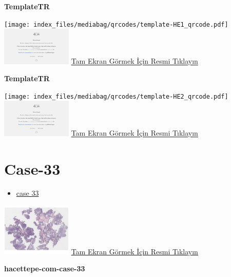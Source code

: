 \documentclass[
  letterpaper,
  DIV=11,
  numbers=noendperiod]{scrreprt}
\providecommand{\tightlist}{%
  \setlength{\itemsep}{0pt}\setlength{\parskip}{0pt}}\usepackage{longtable,booktabs,array}
\begin{document}
\textbf{TemplateTR}

\texttt{[image: index\_files/mediabag/qrcodes/template-HE1\_qrcode.pdf]}
\href{https://images.patolojiatlasi.com/template/HE1.html}{\includegraphics[width=0.25\textwidth,height=\textheight]{./screenshots/thumbnail_template-HE1.png}}
\href{https://images.patolojiatlasi.com/template/HE1.html}{Tam Ekran
Görmek İçin Resmi Tıklayın}

\textbf{TemplateTR}

\texttt{[image: index\_files/mediabag/qrcodes/template-HE2\_qrcode.pdf]}
\href{https://images.patolojiatlasi.com/template/HE2.html}{\includegraphics[width=0.25\textwidth,height=\textheight]{./screenshots/thumbnail_template-HE2.png}}
\href{https://images.patolojiatlasi.com/template/HE2.html}{Tam Ekran
Görmek İçin Resmi Tıklayın}

\hypertarget{sec-hacettepe-case-of-the-month-case-33}{%
\section{Case-33}\label{sec-hacettepe-case-of-the-month-case-33}}

\begin{itemize}
\tightlist
\item
  \href{https://www.youtube.com/watch?v=iWDCr1XysLk&ab_channel=KemalKosemehmetoglu}{case
  33}
\end{itemize}

\href{https://images.patolojiatlasi.com/hacettepe-com-case-33/HE.html}{\includegraphics[width=0.25\textwidth,height=\textheight]{./screenshots/thumbnail_hacettepe-com-case-33.png}}
\href{https://images.patolojiatlasi.com/hacettepe-com-case-33/HE.html}{Tam
Ekran Görmek İçin Resmi Tıklayın}

\textbf{hacettepe-com-case-33}
\end{document}
